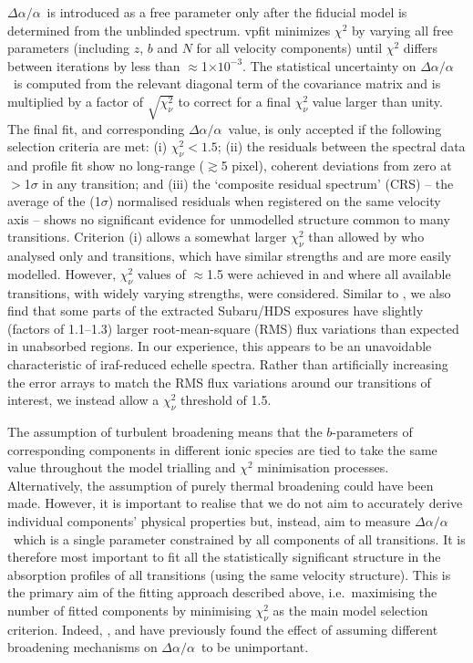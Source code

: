 \documentclass[fleqn,usenatbib,usedcolumn]{mnras}
\renewcommand{\la}{\lesssim} %
\renewcommand{\ga}{\gtrsim} %
\newcommand{\daa}{\ensuremath{\Delta\alpha/\alpha}}
\begin{document}
\daa\ is introduced as a free parameter only after the fiducial model is determined from the unblinded spectrum. {\sc vpfit} minimizes $\chi^2$ by varying all free parameters (including $z$, $b$ and $N$ for all velocity components) until $\chi^2$ differs between iterations by less than $\approx$1$\times10^{-3}$. The statistical uncertainty on \daa\ is computed from the relevant diagonal term of the covariance matrix and is multiplied by a factor of $\sqrt{\chi^2_\nu}$ to correct for a final $\chi^2_\nu$ value larger than unity. The final fit, and corresponding \daa\ value, is only accepted if the following selection criteria are met: (i) $\chi^2_\nu<1.5$; (ii) the residuals between the spectral data and profile fit show no long-range ($\ga$5 pixel), coherent deviations from zero at $>$1$\sigma$ in any transition; and (iii) the `composite residual spectrum' (CRS) -- the average of the (1$\sigma$) normalised residuals when registered on the same velocity axis \citep{Malec:2010:1541} -- shows no significant evidence for unmodelled structure common to many transitions. Criterion (i) allows a somewhat larger $\chi^2_\nu$ than allowed by \citet{Murphy:2016:2461} who analysed only  and  transitions, which have similar strengths and are more easily modelled. However, $\chi^2_\nu$ values of $\approx$1.5 were achieved in \citet{Molaro:2013:A68} and \citet{Evans:2014:128} where all available transitions, with widely varying strengths, were considered. Similar to \citet{Evans:2014:128}, we also find that some parts of the extracted Subaru/HDS exposures have slightly (factors of 1.1--1.3) larger root-mean-square (RMS) flux variations than expected in unabsorbed regions. In our experience, this appears to be an unavoidable characteristic of {\sc iraf}-reduced echelle spectra. Rather than artificially increasing the error arrays to match the RMS flux variations around our transitions of interest, we instead allow a $\chi^2_\nu$ threshold of 1.5.

The assumption of turbulent broadening means that the $b$-parameters of corresponding components in different ionic species are tied to take the same value throughout the model trialling and $\chi^2$ minimisation processes. Alternatively, the assumption of purely thermal broadening could have been made. However, it is important to realise that we do not aim to accurately derive individual components' physical properties but, instead, aim to measure \daa\ which is a single parameter constrained by all components of all transitions. It is therefore most important to fit all the statistically significant structure in the absorption profiles of all transitions (using the same velocity structure). This is the primary aim of the fitting approach described above, i.e.\ maximising the number of fitted components by minimising $\chi^2_\nu$ as the main model selection criterion. Indeed, \citet{Murphy:2003:609}, \citet{King:2012:3370} and
\citet{Evans:2014:128} have previously found the effect of assuming different broadening mechanisms on \daa\ to be unimportant.
\end{document}
